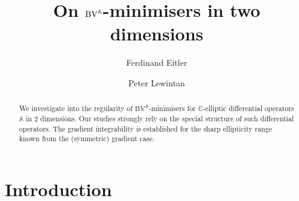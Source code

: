 \documentclass[a4paper,10pt,reqno,oneside]{amsart}
\title{On $\BV^\Aop$-minimisers in two dimensions}
\author[F. Eitler]{Ferdinand Eitler}
\author[P. Lewintan]{Peter Lewintan}
\numberwithin{equation}{section}
\newcommand{\C}{\mathbb C}
\newcommand{\Aop}{\mathbb{A}}
\newcommand{\BV}{\mathrm{BV}}
\begin{document}
\begin{abstract}
We investigate into the regularity of $\BV^\Aop$-minimisers for $\C$-elliptic differential operators $\Aop$ in $2$ dimensions. Our studies strongly rely on the special structure of such differential operators. The gradient integrability is established for the sharp ellipticity range known from the (symmetric) gradient case.

\end{abstract}

\maketitle
\section{Introduction}

\end{document}
